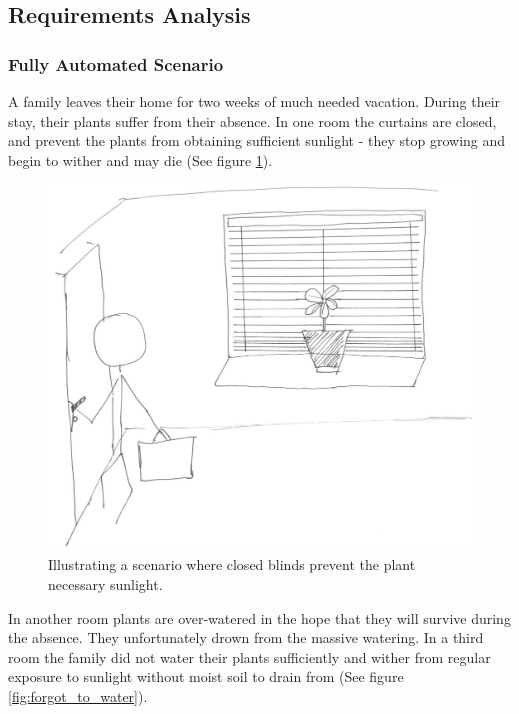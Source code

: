 \documentclass{ubicomp2012}
\begin{document}
\subsection{Requirements Analysis}

\subsubsection{Fully Automated Scenario}
A family leaves their home for two weeks of much needed vacation. During their stay, their plants suffer from their absence.
In one room the curtains are closed, and prevent the plants from obtaining sufficient sunlight - they stop growing and begin to wither and may die (See figure \ref{fig:closed_blinds}).

\begin{figure}[h!]
\centering
\includegraphics[width=\columnwidth]{closed_blinds.png}
\caption{Illustrating a scenario where closed blinds prevent the plant necessary sunlight.}
\label{fig:closed_blinds}
\end{figure}

In another room plants are over-watered in the hope that they will survive during the absence. They unfortunately drown from the massive watering.
In a third room the family did not water their plants sufficiently and wither from regular exposure to sunlight without moist soil to drain from (See figure \ref{fig:forgot_to_water}).
\end{document}
